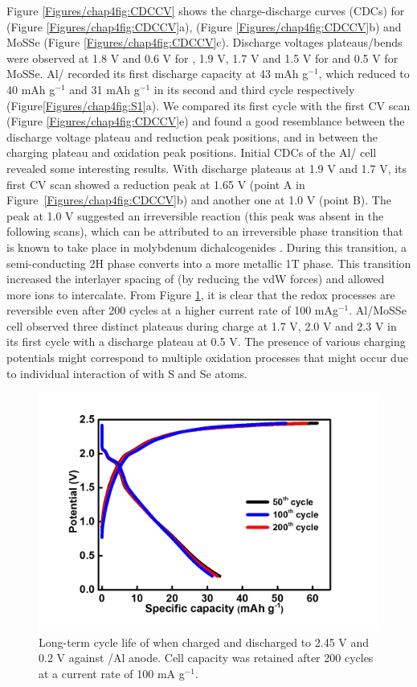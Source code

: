 Figure \ref{Figures/chap4fig:CDCCV} shows the charge-discharge curves (CDCs) for  (Figure \ref{Figures/chap4fig:CDCCV}a),  (Figure \ref{Figures/chap4fig:CDCCV}b) and MoSSe (Figure \ref{Figures/chap4fig:CDCCV}c). Discharge voltages plateaus/bends  were observed at 1.8 V and 0.6 V  for , 1.9 V, 1.7 V  and 1.5 V for  and 0.5 V for MoSSe. Al/  recorded its first discharge capacity at 43 mAh g$^{-1}$, which reduced to 40 mAh g$^{-1}$ and 31 mAh g$^{-1}$ in its second and third cycle respectively (Figure\ref{Figures/chap4fig:S1}a). We compared its first cycle with the first CV scan (Figure \ref{Figures/chap4fig:CDCCV}e) and found a good resemblance between the discharge voltage plateau and reduction peak positions, and in between the charging plateau and oxidation peak positions. Initial CDCs of the Al/ cell revealed some interesting results. With discharge plateaus at 1.9 V and 1.7 V, its first CV scan showed a reduction peak at 1.65 V (point A in Figure\ \ref{Figures/chap4fig:CDCCV}b) and another one at 1.0 V (point B). The peak at 1.0 V suggested an irreversible reaction (this peak was absent in the following scans), which can be attributed to an irreversible phase transition that is known to take place in molybdenum dichalcogenides \cite{fan_hybrid_2017}. During this transition, a semi-conducting 2H phase converts into a more metallic 1T phase.  This transition increased the interlayer spacing of  (by reducing the vdW forces) and allowed more  ions to intercalate. From Figure \ref{Figures/chap4fig:mose2}, it is clear that the redox processes are reversible even after 200 cycles  at a higher current rate of 100 mAg$^{-1}$. Al/MoSSe cell observed three distinct plateaus during charge at 1.7 V, 2.0 V and 2.3 V in its first cycle with a discharge plateau at 0.5 V. The presence of various charging potentials might correspond to multiple oxidation processes that might occur due to individual interaction of  with S and Se atoms. 
\begin{figure}[htb!]
\centering
\includegraphics[width=\textwidth]{Figures/chap4fig/mose2}
\caption{Long-term cycle life of  when charged and discharged to 2.45 V and 0.2 V against /Al anode. Cell capacity was retained after 200 cycles at a current rate of 100 mA g$^{-1}$.}
\label{Figures/chap4fig:mose2}
\end{figure}
